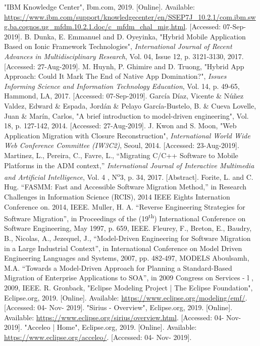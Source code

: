 \documentclass[conference]{IEEEtran}
\begin{document}
\begin{thebibliography}{00}
 "IBM Knowledge Center", Ibm.com, 2019. [Online]. Available: \url{https://www.ibm.com/support/knowledgecenter/en/SSEP7J_10.2.1/com.ibm.swg.ba.cognos.ug_mfdm.10.2.1.doc/c_mfdm_chal_mig.html}. [Accessed: 07-Sep-2019].
 B. Dunka, E. Emmanuel and D. Oyeyinka, "Hybrid Mobile Application Based on Ionic Framework Technologies", \textit{International Journal of Recent Advances in Multidisciplinary Research}, Vol. 04, Issue 12, p. 3121-3130, 2017. [Accessed: 27-Aug-2019].
 M. Huynh, P. Ghimire and D. Truong, "Hybrid App Approach: Could It Mark The End of Native App Domination?", \textit{Issues Informing Science and Information Technology Education}, Vol. 14, p. 49-65, Hammond, LA, 2017. [Accessed: 07-Sep-2019].
 García Díaz, Vicente \& Núñez Valdez, Edward \& Espada, Jordán  \& Pelayo García-Bustelo, B. \& Cueva Lovelle, Juan \& Marín, Carlos, "A brief introduction to model-driven engineering", Vol. 18, p. 127-142, 2014. [Accessed: 27-Aug-2019].
 J. Kwon and S. Moon, "Web Application Migration with Closure Reconstruction", \textit{International World Wide Web Conference Committee (IW3C2)}, Seoul, 2014. [Accessed: 23-Aug-2019].
 Martinez, L., Pereira, C., Favre, L., ``Migrating C/C++ Software to Mobile Platforms in the ADM context,'' \textit{International Journal of Interactive Multimedia and Artificial Intelligence}, Vol. 4 , N\textsuperscript{o}3, p. 34, 2017. [Abstract].
 Forite, L. and C. Hug. ``FASMM: Fast and Accessible Software Migration Method,'' in Research Challenges in Information Science (RCIS), 2014 IEEE Eights Internation Conference on. 2014, IEEE.
 Muller, H. A. ``Reverse Engineering Strategies for Software Migration'', in Proceedings of the (19\textsuperscript{th}) International Conference on Software Engineering, May 1997, p. 659, IEEE.
 Fleurey, F., Breton, E., Baudry, B., Nicolas, A., Jezequel, J., ``Model-Driven Engineering for Software Migration in a Large Industrial Context'', in International Conference on Model Driven Engineering Languages and Systems, 2007, pp. 482-497, MODELS
 Aboulsamh, M.A. ``Towards a Model-Driven Approach for Planning a Standard-Based Migration of Enterprise Applications to SOA'', in 2009 Congress on Services - l , 2009, IEEE.
 R. Gronback, "Eclipse Modeling Project | The Eclipse Foundation", Eclipse.org, 2019. [Online]. Available: \url{https://www.eclipse.org/modeling/emf/}. [Accessed: 04- Nov- 2019].
 "Sirius - Overview", Eclipse.org, 2019. [Online]. Available: \url{https://www.eclipse.org/sirius/overview.html}. [Accessed: 04- Nov- 2019].
 "Acceleo | Home", Eclipse.org, 2019. [Online]. Available: \url{https://www.eclipse.org/acceleo/}. [Accessed: 04- Nov- 2019].
\end{thebibliography}
\vspace{12pt}
\color{red}
\end{document}
